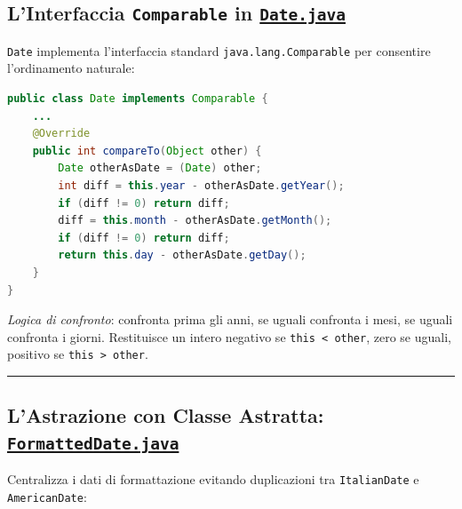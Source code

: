 \documentclass[11pt,a4paper,oneside]{report}
\newcommand{\passthrough}[1]{#1}
\begin{document}
\subsection{\texorpdfstring{L'Interfaccia \texttt{Comparable} in
\href{file:///home/wally/Documenti/GitHub/Programmazione-II/25-26/Teoria-e-Esercitazioni/Codice-20260902/Lezione12/MavenDate/src/main/java/it/oop/core/Date.java}{\texttt{Date.java}}}{L'Interfaccia Comparable in Date.java}}\label{chap11_linterfaccia-comparable-in-date.java}

\passthrough{\lstinline!Date!} implementa l'interfaccia standard
\passthrough{\lstinline!java.lang.Comparable!} per consentire
l'ordinamento naturale:

\begin{lstlisting}[language=Java]
public class Date implements Comparable {
    ...
    @Override
    public int compareTo(Object other) {
        Date otherAsDate = (Date) other;
        int diff = this.year - otherAsDate.getYear();
        if (diff != 0) return diff;
        diff = this.month - otherAsDate.getMonth();
        if (diff != 0) return diff;
        return this.day - otherAsDate.getDay();
    }
}
\end{lstlisting}

\emph{Logica di confronto}: confronta prima gli anni, se uguali
confronta i mesi, se uguali confronta i giorni. Restituisce un intero
negativo se \passthrough{\lstinline!this < other!}, zero se uguali,
positivo se \passthrough{\lstinline!this > other!}.

\begin{center}\rule{0.5\linewidth}{0.5pt}\end{center}

\subsection{\texorpdfstring{L'Astrazione con Classe Astratta:
\href{file:///home/wally/Documenti/GitHub/Programmazione-II/25-26/Teoria-e-Esercitazioni/Codice-20260902/Lezione12/MavenDate/src/main/java/it/oop/core/FormattedDate.java}{\texttt{FormattedDate.java}}}{L'Astrazione con Classe Astratta: FormattedDate.java}}\label{chap11_lastrazione-con-classe-astratta-formatteddate.java}

Centralizza i dati di formattazione evitando duplicazioni tra
\passthrough{\lstinline!ItalianDate!} e
\passthrough{\lstinline!AmericanDate!}:
\end{document}
